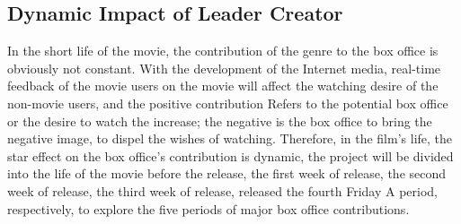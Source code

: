 \subsection{Dynamic Impact of Leader Creator}
In the short life of the movie, the contribution of the genre to the box office is obviously not constant. With the development of the Internet media, real-time feedback of the movie users on the movie will affect the watching desire of the non-movie users, and the positive contribution Refers to the potential box office or the desire to watch the increase; the negative is the box office to bring the negative image, to dispel the wishes of watching. Therefore, in the film's life, the star effect on the box office's contribution is dynamic, the project will be divided into the life of the movie before the release, the first week of release, the second week of release, the third week of release, released the fourth Friday A period, respectively, to explore the five periods of major box office contributions. 